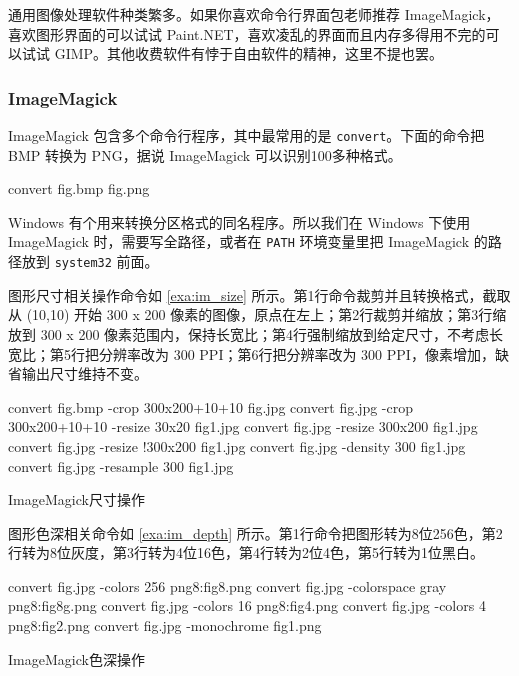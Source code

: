 通用图像处理软件种类繁多。如果你喜欢命令行界面包老师推荐 ImageMagick，喜欢图形界面的可以试试 Paint.NET，喜欢凌乱的界面而且内存多得用不完的可以试试 GIMP。其他收费软件有悖于自由软件的精神，这里不提也罢。

\subsubsection{ImageMagick}

ImageMagick 包含多个命令行程序，其中最常用的是 \texttt{convert}。下面的命令把 BMP 转换为 PNG，据说 ImageMagick 可以识别100多种格式。

\begin{Code}[]
convert fig.bmp fig.png 
\end{Code}

Windows 有个用来转换分区格式的同名程序。所以我们在 Windows 下使用 ImageMagick 时，需要写全路径，或者在 \texttt{PATH} 环境变量里把 ImageMagick 的路径放到 \texttt{system32} 前面。

图形尺寸相关操作命令如 \autoref{exa:im_size} 所示。第1行命令裁剪并且转换格式，截取从 (10,10) 开始 300 x 200 像素的图像，原点在左上；第2行裁剪并缩放；第3行缩放到 300 x 200 像素范围内，保持长宽比；第4行强制缩放到给定尺寸，不考虑长宽比；第5行把分辨率改为 300 PPI；第6行把分辨率改为 300 PPI，像素增加，缺省输出尺寸维持不变。

\begin{example}[h]
\begin{Code}[numbers=left]
convert fig.bmp -crop 300x200+10+10 fig.jpg
convert fig.jpg -crop 300x200+10+10 -resize 30x20 fig1.jpg
convert fig.jpg -resize 300x200 fig1.jpg
convert fig.jpg -resize !300x200 fig1.jpg
convert fig.jpg -density 300 fig1.jpg
convert fig.jpg -resample 300 fig1.jpg
\end{Code}
\caption{ImageMagick尺寸操作}
\label{exa:im_size}
\end{example}

图形色深相关命令如 \autoref{exa:im_depth} 所示。第1行命令把图形转为8位256色，第2行转为8位灰度，第3行转为4位16色，第4行转为2位4色，第5行转为1位黑白。

\begin{example}[h]
\begin{Code}[numbers=left]
convert fig.jpg -colors 256 png8:fig8.png
convert fig.jpg -colorspace gray png8:fig8g.png
convert fig.jpg -colors 16 png8:fig4.png
convert fig.jpg -colors 4 png8:fig2.png
convert fig.jpg -monochrome fig1.png
\end{Code}
\caption{ImageMagick色深操作}
\label{exa:im_depth}
\end{example}

